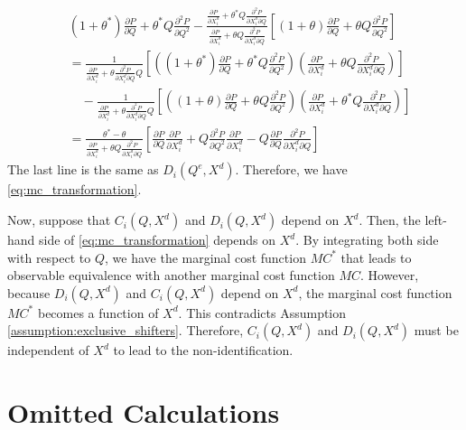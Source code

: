 \documentclass[11pt, a4paper]{article}
\theoremstyle{remark}
\begin{document}
\begin{align}
    & (1+ \theta^{*})\frac{\partial P}{\partial Q} + \theta^{*} Q\frac{\partial^2 P}{\partial Q^2} - \frac{\frac{\partial P}{\partial X^{d}_i} + \theta^{*} Q\frac{\partial^2 P}{\partial X^{d}_{i}\partial Q} }{\frac{\partial P}{\partial X^{d}_i} + \theta Q\frac{\partial^2 P}{\partial X^{d}_{i}\partial Q} }\left[(1+ \theta) \frac{\partial P}{\partial Q} + \theta Q\frac{\partial^2 P}{\partial Q^2}\right]\\
    &= \frac{1}{\frac{\partial P}{\partial X^{d}_i} + \theta\frac{\partial^2 P}{\partial X^{d}_{i}\partial Q}Q}\left[\left((1 + \theta^{*}) \frac{\partial P}{\partial Q} + \theta^{*} Q\frac{\partial^2 P}{\partial  Q^2}\right)\left(\frac{\partial P}{\partial X^{d}_i} + \theta Q\frac{\partial^2 P}{\partial X^{d}_{i}\partial Q}\right)\right]\\
    &\quad - \frac{1}{\frac{\partial P}{\partial X^{d}_i} + \theta\frac{\partial^2 P}{\partial X^{d}_{i}\partial Q}Q}\left[\left( (1 + \theta) \frac{\partial P}{\partial Q} + \theta Q\frac{\partial^2 P}{\partial Q^2}\right)\left(\frac{\partial P}{\partial X^{d}_i} + \theta^{*} Q\frac{\partial^2 P}{\partial X^{d}_{i}\partial Q}\right)\right]\\
    & = \frac{\theta^{*} - \theta}{\frac{\partial P}{\partial X^{d}_i} + \theta Q\frac{\partial^2 P}{\partial X^{d}_{i}\partial Q}}\left[\frac{\partial P}{\partial Q} \frac{\partial P}{\partial X^{d}_i} + Q\frac{\partial^2 P}{\partial Q^2} \frac{\partial P}{\partial X^{d}_i} - Q \frac{\partial P}{\partial Q} \frac{\partial^2 P}{\partial X^{d}_i\partial Q} \right]
\end{align}
The last line is the same as $D_i(Q^e, X^{d})$.
Therefore, we have \eqref{eq:mc_transformation}.

Now, suppose that $C_i(Q, X^{d})$ and $D_i(Q, X^{d})$ depend on $X^{d}$.
Then, the left-hand side of \eqref{eq:mc_transformation} depends on $X^{d}$.
By integrating both side with respect to $Q$, we have the marginal cost function $MC^{*}$ that leads to observable equivalence with another marginal cost function $MC$.
However, because $D_i(Q, X^{d})$ and $C_i(Q, X^{d})$ depend on $X^{d}$, the marginal cost function $MC^{*}$ becomes a function of $X^{d}$.
This contradicts Assumption \ref{assumption:exclusive_shifters}.
Therefore, $C_i(Q, X^{d})$ and $D_i(Q, X^{d})$ must be independent of $X^{d}$ to lead to the non-identification.

\section{Omitted Calculations}\label{omitted_calculation}
\end{document}
